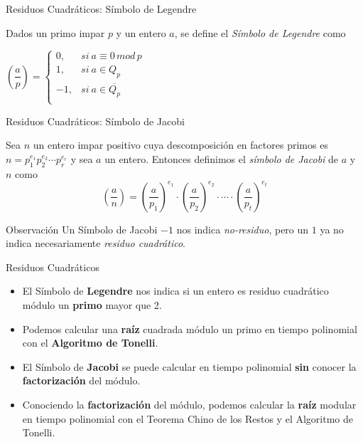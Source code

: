 \documentclass{beamer}
\begin{document}
\begin{frame}{Residuos Cuadráticos: Símbolo de Legendre}
	\begin{definition}
		Dados un primo impar $p$ y un entero $a$, se define el {\em Símbolo de Legendre} como
		
		\begin{center}
			$
			\left( \dfrac{a}{p} \right) =
			\begin{cases}
			0, & si\ a \equiv 0 \, mod \, p\\
			1, & si\ a \in Q_p  \\
			-1, & si\ a \in \overline{Q_p} \\
			\end{cases}
			$
		\end{center}
	\end{definition}
\end{frame}


\begin{frame}{Residuos Cuadráticos: Símbolo de Jacobi}
	\begin{definition}
		Sea $n$ un entero impar positivo cuya descomposici\'on en factores primos es $n = p_1^{e_1} p_2^{e_2} \cdots p_r^{e_r}$ y sea $a$ un entero. Entonces definimos
		el \textit{s\'imbolo de Jacobi} de $a$ y $n$ como
		\[\left( \dfrac{a}{n} \right) = \left( \dfrac{a}{p_1} \right)^{e_1} \cdot \left( \dfrac{a}{p_2} \right)^{e_2} \cdot \cdots \cdot \left( \dfrac{a}{p_t} \right)^{e_t}\]
	\end{definition}
	\begin{alertblock}{Observación}
		Un Símbolo de Jacobi $-1$ nos indica \textit{no-residuo}, pero un $1$ ya no indica necesariamente \textit{residuo cuadrático}.
	\end{alertblock}
\end{frame}



\begin{frame}{Residuos Cuadráticos}
	\begin{itemize}
		\item El Símbolo de \textbf{Legendre} nos indica si un entero es residuo cuadrático módulo un \textbf{primo} mayor que 2.
		\item Podemos calcular una \textbf{raíz} cuadrada módulo un primo en tiempo polinomial con el \textbf{Algoritmo de Tonelli}.
		\item El Símbolo de \textbf{Jacobi} se puede calcular en tiempo polinomial \textbf{sin} conocer la \textbf{factorización} del módulo.
		\item Conociendo la \textbf{factorización} del módulo, podemos calcular la \textbf{raíz} modular en tiempo polinomial con el Teorema Chino de los Restos y el Algoritmo de Tonelli.
	\end{itemize}
\end{frame}
\end{document}
